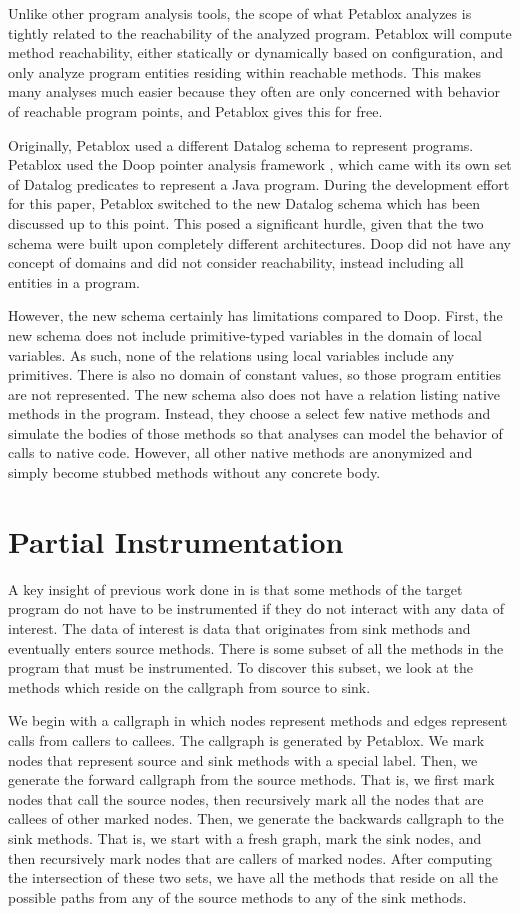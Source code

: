 Unlike other program analysis tools, the scope of what Petablox analyzes is tightly related to the reachability of the analyzed program. Petablox will compute method reachability, either statically or dynamically based on configuration, and only analyze program entities residing within reachable methods. This makes many analyses much easier because they often are only concerned with behavior of reachable program points, and Petablox gives this for free.

Originally, Petablox used a different Datalog schema to represent programs. Petablox used the Doop pointer analysis framework \cite{doop}, which came with its own set of Datalog predicates to represent a Java program. During the development effort for this paper, Petablox switched to the new Datalog schema which has been discussed up to this point. This posed a significant hurdle, given that the two schema were built upon completely different architectures. Doop did not have any concept of domains and did not consider reachability, instead including all entities in a program.  

However, the new schema certainly has limitations compared to Doop. First, the new schema does not include primitive-typed variables in the domain of local variables. As such, none of the relations using local variables include any primitives. There is also no domain of constant values, so those program entities are not represented. The new schema also does not have a relation listing native methods in the program. Instead, they choose a select few native methods and simulate the bodies of those methods so that analyses can model the behavior of calls to native code. However, all other native methods are anonymized and simply become stubbed methods without any concrete body.
\section{Partial Instrumentation}
A key insight of previous work done in \cite{manoj_project} is that some methods of the target program do not have to be instrumented if they do not interact with any data of interest. The data of interest is data that originates from sink methods and eventually enters source methods. There is some subset of all the methods in the program that must be instrumented. To discover this subset, we look at the methods which reside on the callgraph from source to sink. 

We begin with a callgraph in which nodes represent methods and edges represent calls from callers to callees. The callgraph is generated by Petablox. We mark nodes that represent source and sink methods with a special label. Then, we generate the forward callgraph from the source methods. That is, we first mark nodes that call the source nodes, then recursively mark all the nodes that are callees of other marked nodes. Then, we generate the backwards callgraph to the sink methods. That is, we start with a fresh graph, mark the sink nodes, and then recursively mark nodes that are callers of marked nodes. After computing the intersection of these two sets, we have all the methods that reside on all the possible paths from any of the source methods to any of the sink methods. 

